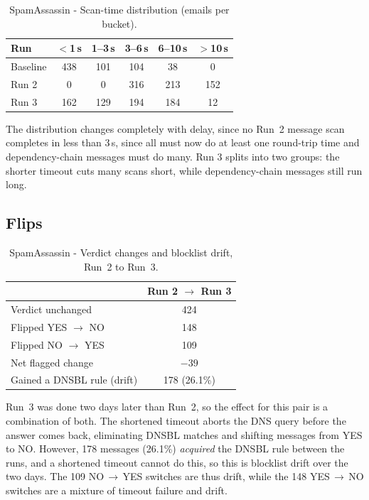 \begin{table}[H]\centering
\small
\begin{tabular}{@{}lccccc@{}}
\toprule
Run & $<$1\,s & 1--3\,s & 3--6\,s & 6--10\,s & $>$10\,s \\
\midrule
Baseline & 438 & 101 & 104 & 38  & 0 \\
Run 2    & 0   & 0   & 316 & 213 & 152 \\
Run 3    & 162 & 129 & 194 & 184 & 12 \\
\bottomrule
\end{tabular}
\caption{SpamAssassin - Scan-time distribution (emails per bucket).}
\label{tab:sa-timing}
\end{table}

The distribution changes completely with delay, since no Run~2 message scan completes in less than 3\,s, since all must now do at least one round-trip time and dependency-chain messages must do many. Run 3 splits into two groups: the shorter timeout cuts many scans short, while dependency-chain messages still run long.

\subsection{Flips}
\label{sec:sa-flips}

\begin{table}[H]\centering
\small
\begin{tabular}{@{}lc@{}}
\toprule
 & Run 2 $\to$ Run 3 \\
\midrule
Verdict unchanged           & 424 \\
Flipped YES $\to$ NO        & 148 \\
Flipped NO $\to$ YES        & 109 \\
Net flagged change          & $-39$ \\
Gained a DNSBL rule (drift) & 178 (26.1\%) \\
\bottomrule
\end{tabular}
\caption{SpamAssassin - Verdict changes and blocklist drift, Run~2 to Run~3.}
\label{tab:sa-flips}
\end{table}

Run~3 was done two days later than Run~2, so the effect for this pair is a combination of both. The shortened timeout aborts the DNS query before the answer comes back, eliminating DNSBL matches and shifting messages from YES to NO. However, 178 messages (26.1\%) \emph{acquired} the DNSBL rule between the runs, and a shortened timeout cannot do this, so this is blocklist drift over the two days. The 109 NO\,$\to$\,YES switches are thus drift, while the 148 YES\,$\to$\,NO switches are a mixture of timeout failure and drift. 

